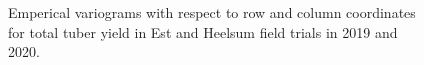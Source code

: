 \begin{figure}[H]

{\centering {}

}

\caption{Emperical variograms with respect to row and column coordinates
for total tuber yield in Est and Heelsum field trials in 2019 and 2020.}

\end{figure}%

